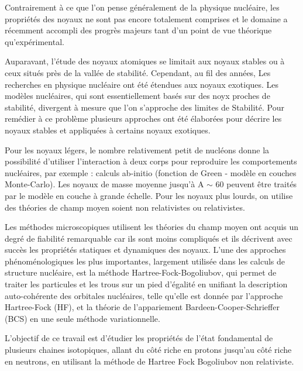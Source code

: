 
Contrairement à ce que l'on pense généralement de la physique nucléaire, les propriétés des noyaux ne sont pas encore totalement comprises et le domaine a récemment accompli des progrès majeurs tant d'un point de vue théorique qu'expérimental.

Auparavant, l'étude des noyaux atomiques se limitait aux noyaux stables ou à ceux situés près de la vallée de stabilité. Cependant, au fil des années, Les recherches en physique nucléaire ont été étendues aux noyaux exotiques. Les modèles nucléaires, qui sont essentiellement basés sur des noyx proches de stabilité, divergent à mesure que l'on s'approche des limites de Stabilité. Pour remédier à ce problème plusieurs approches ont été élaborées  pour décrire les noyaux stables et appliquées à certains noyaux exotiques.

Pour les noyaux légers, le nombre relativement petit de nucléons donne la possibilité d’utiliser l’interaction à deux corps pour reproduire les comportements nucléaires, par exemple : calculs ab-initio (fonction de Green - modèle en couches Monte-Carlo). Les noyaux de masse moyenne jusqu’à A ${\sim}$ 60 peuvent être traités par le modèle en couche à grande échelle. Pour les noyaux plus lourds, on utilise des théories de champ moyen soient non relativistes  ou relativistes. 

Les méthodes microscopiques utilisent les théories du champ moyen ont acquis un degré de fiabilité remarquable car ils sont moins compliqués et ils décrivent avec succès les propriétés statiques et dynamiques des noyaux. L'une des approches phénoménologiques les plus importantes, largement utilisée dans les calculs de structure nucléaire, est la méthode Hartree-Fock-Bogoliubov, qui permet de traiter les particules et les trous sur un pied d'égalité en unifiant la description auto-cohérente des orbitales nucléaires, telle qu'elle est donnée par l'approche Hartree-Fock (HF), et la théorie de l'appariement Bardeen-Cooper-Schrieffer (BCS) en une seule méthode variationnelle.

L’objectif de ce travail est d’étudier les propriétés de l’état fondamental de plusieurs chaines isotopiques, allant du côté riche en protons jusqu’au côté riche en neutrons, en utilisant la méthode de Hartree Fock Bogoliubov non relativiste.


\thispagestyle{empty}

